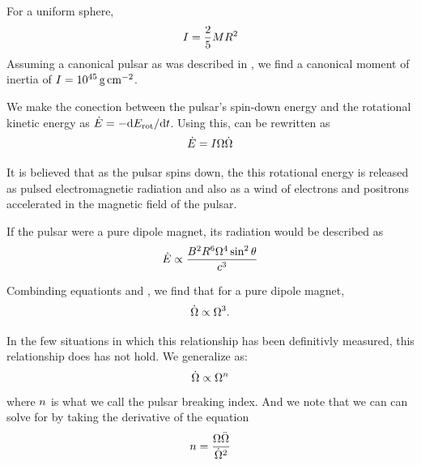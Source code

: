For a uniform sphere,
\begin{equation}
  I = \frac{2}{5} M R^2
\end{equation}
Assuming a canonical pulsar as was described in ,
we find a canonical moment of inertia of 
$I=10^{45}\,\text{g}\,\text{cm}^{-2}$.

We make the conection between the pulsar's spin-down
energy and the rotational kinetic energy as $\dot{E} = -
\text{d}E_\text{rot}/\text{d}t$. Using this,
 can be rewritten as
\begin{equation}\eqnlabel{edot_from_rotation}
  \energydot = I \angularfrequency \angularfrequencydot
\end{equation}

It is believed that as the pulsar spins down, the this rotational energy
is released as pulsed electromagnetic radiation and also as a wind of
electrons and positrons accelerated in the magnetic field of the pulsar.

If the pulsar were a pure dipole magnet, its radiation would be
described as \citep{gunn_1969_magnetic-dipole}
\begin{equation}\eqnlabel{edot_pure_dipole}
  \energydot \propto \frac{\MagneticField^2 \PulsarRadius^6 
  \angularfrequency^4 \sin^2\PulsarRotationAngle}{
  \speedoflight^3}
\end{equation}

Combinding equationts  and
, we find that for a pure dipole magnet,
\begin{equation}\eqnlabel{breaking_index_dipole}
\angularfrequencydot \propto \angularfrequency^3.
\end{equation}

In the few situations in which this relationship has been
definitivly measured, this relationship does has not hold.
We generalize  as:
\begin{equation}\eqnlabel{angular_frequency_derivative_relation}
  \angularfrequencydot \propto \angularfrequency^\breakingindex
\end{equation}
where $n$ is what we call the pulsar breaking index. 
And we note that 
we can can solve for \breakingindex by taking the derivative of the equation
\begin{equation}
  n = \frac{\Omega \ddot{\Omega}}{\dot{\Omega}^2}
\end{equation}

